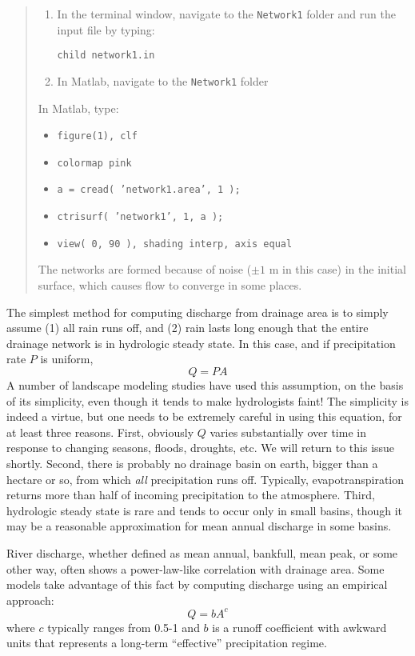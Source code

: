 \documentclass[12pt,reqno]{amsart}
\begin{document}
\begin{quote}
\small
{\sf
\begin{enumerate}
\item
In the terminal window, navigate to the {\tt Network1} folder and run the input file by typing:

{\tt child network1.in}
\item
In Matlab, navigate to the {\tt Network1} folder
\end{enumerate}

In Matlab, type:
\begin{itemize}
\setcounter{enumi}{2}
\item
{\tt figure(1), clf}
\item
{\tt colormap pink}
\item
{\tt a = cread( 'network1.area', 1 );}
\item
{\tt ctrisurf( 'network1', 1, a );}
\item
{\tt view( 0, 90 ), shading interp, axis equal}
\end{itemize}

The networks are formed because of noise ($\pm1$ m in this case) in the initial surface, which causes flow to converge in some places.
}
\end{quote}

The simplest method for computing discharge from drainage area is to simply assume (1) all rain runs off, and (2) rain lasts long enough that the entire drainage network is in hydrologic steady state. In this case, and if precipitation rate $P$ is uniform,
\begin{equation}
Q = PA
\end{equation}
A number of landscape modeling studies have used this assumption, on the basis of its simplicity, even though it tends to make hydrologists faint! The simplicity is indeed a virtue, but one needs to be extremely careful in using this equation, for at least three reasons. First, obviously $Q$ varies substantially over time in response to changing seasons, floods, droughts, etc. We will return to this issue shortly. Second, there is probably no drainage basin on earth, bigger than a hectare or so, from which {\em all} precipitation runs off. Typically, evapotranspiration returns more than half of incoming precipitation to the atmosphere. Third, hydrologic steady state is rare and tends to occur only in small basins, though it may be a reasonable approximation for mean annual discharge in some basins.

River discharge, whether defined as mean annual, bankfull, mean peak, or some other way, often shows a power-law-like correlation with drainage area. Some models take advantage of this fact by computing discharge using an empirical approach:
\begin{equation}
Q = b A^c
\end{equation}
where $c$ typically ranges from 0.5-1 and $b$ is a runoff coefficient with awkward units that represents a long-term ``effective'' precipitation regime.
\end{document}
